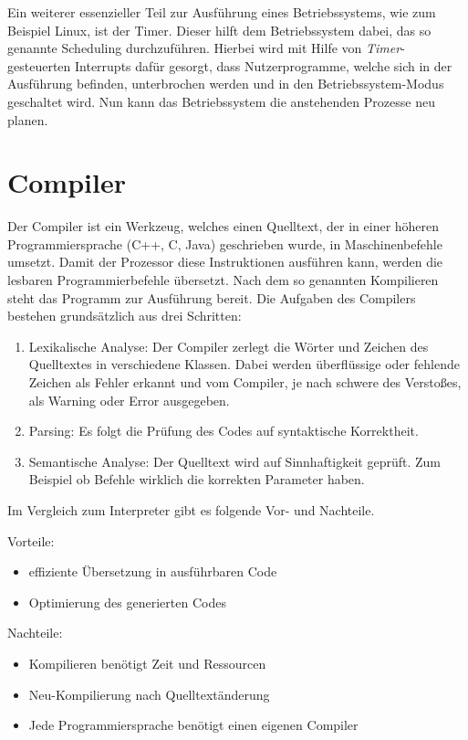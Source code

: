 Ein weiterer essenzieller Teil zur Ausführung eines Betriebssystems, wie zum Beispiel Linux, ist der Timer. Dieser hilft dem Betriebssystem dabei, das so genannte Scheduling
durchzuführen. Hierbei wird mit Hilfe von \emph{Timer}-gesteuerten Interrupts dafür gesorgt, dass Nutzerprogramme, welche sich in der Ausführung befinden, unterbrochen werden und
in den Betriebssystem-Modus geschaltet wird. Nun kann das Betriebssystem die anstehenden Prozesse neu planen.\\


\section{Compiler}\label{kap:compiler}

Der Compiler ist ein Werkzeug, welches einen Quelltext, der in einer höheren Programmiersprache (C++, C, Java) geschrieben wurde, in Maschinenbefehle umsetzt.
 Damit der Prozessor diese Instruktionen ausführen kann, werden die lesbaren Programmierbefehle übersetzt. Nach dem so genannten Kompilieren steht das Programm zur Ausführung bereit.
Die Aufgaben des Compilers bestehen grundsätzlich aus drei Schritten:\cite{compiler}
\begin{enumerate}
  \item Lexikalische Analyse:
  	Der Compiler zerlegt die Wörter und Zeichen des Quelltextes in verschiedene Klassen. Dabei werden überflüssige oder fehlende Zeichen als Fehler erkannt und vom Compiler, je nach
  schwere des Verstoßes, als Warning oder Error ausgegeben.
  \item Parsing:
  	Es folgt die Prüfung des Codes auf syntaktische Korrektheit.
  \item Semantische Analyse: Der Quelltext wird auf Sinnhaftigkeit geprüft. Zum Beispiel ob Befehle wirklich die korrekten Parameter haben.
\end{enumerate}

Im Vergleich zum Interpreter gibt es folgende Vor- und Nachteile.

Vorteile:
\begin{itemize}
  \item effiziente Übersetzung in ausführbaren Code
  \item Optimierung des generierten Codes
\end{itemize}

Nachteile:
\begin{itemize}
  \item Kompilieren benötigt Zeit und Ressourcen
  \item Neu-Kompilierung nach Quelltextänderung
  \item Jede Programmiersprache benötigt einen eigenen Compiler
\end{itemize}

